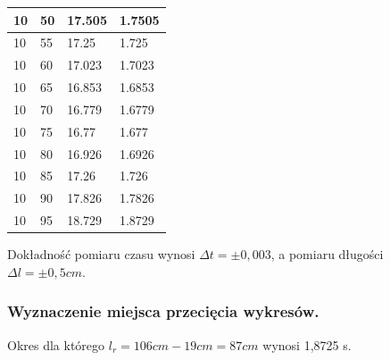 \documentclass[a4paper, 11pt]{article}
\begin{document}
\begin{adjustwidth}{-0.125\textwidth}{-0.125\textwidth}
\begin{center}
\begin{tabular}{|l|l|l|l|}
			10             & 50           & 17.505   & 1.7505    \\ \hline
			10             & 55           & 17.25    & 1.725     \\ \hline
			10             & 60           & 17.023   & 1.7023    \\ \hline
			10             & 65           & 16.853   & 1.6853    \\ \hline
			10             & 70           & 16.779   & 1.6779    \\ \hline
			10             & 75           & 16.77    & 1.677     \\ \hline
			10             & 80           & 16.926   & 1.6926    \\ \hline
			10             & 85           & 17.26    & 1.726     \\ \hline
			10             & 90           & 17.826   & 1.7826    \\ \hline
			10             & 95           & 18.729   & 1.8729    \\ \hline
		\end{tabular}
	\end{center}
\end{adjustwidth}
Dokładność pomiaru czasu wynosi $\Delta t = \pm0,003$, a pomiaru długości $\Delta l = \pm0,5cm$.

\subsubsection{Wyznaczenie miejsca przecięcia wykresów.}
\begin{center}
\end{center}
Okres dla którego $l_r = 106cm - 19cm = 87cm$ wynosi 1,8725 s.
\end{document}
